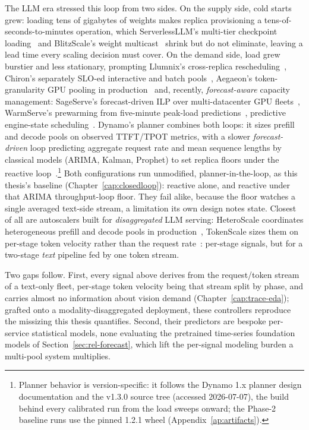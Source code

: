 The LLM era stressed this loop from two sides. On the supply side, cold
starts grew: loading tens of gigabytes of weights makes replica
provisioning a tens-of-seconds-to-minutes operation, which
ServerlessLLM's multi-tier checkpoint loading~\cite{Fu2024ServerlessLLM}
and BlitzScale's weight multicast~\cite{Zhang2025BlitzScale} shrink but
do not eliminate, leaving a lead time every scaling decision must cover.
On the demand side, load grew burstier and less stationary, prompting
Llumnix's cross-replica rescheduling~\cite{Llumnix2024}, Chiron's
separately SLO-ed interactive and batch
pools~\cite{Patke2025Chiron}, Aegaeon's token-granularity GPU
pooling in production~\cite{Xiang2025Aegaeon} and, recently,
\emph{forecast-aware} capacity management: SageServe's forecast-driven
ILP over multi-datacenter GPU fleets~\cite{Jaiswal2025SageServe},
WarmServe's prewarming from five-minute peak-load
predictions~\cite{WarmServe2025}, predictive engine-state
scheduling~\cite{Zhang2025SynergySched}. Dynamo's planner
combines both loops: it sizes prefill and decode pools on
observed TTFT/TPOT metrics, with a slower \emph{forecast-driven} loop
predicting aggregate request rate and mean sequence lengths by classical
models (ARIMA, Kalman, Prophet) to set replica floors under the reactive
loop~\cite{Dynamo2025}.\footnote{Planner behavior is version-specific:
it follows the Dynamo 1.x planner design documentation and the v1.3.0
source tree (accessed 2026-07-07), the build behind every calibrated
run from the load sweeps onward; the Phase-2 baseline runs use the
pinned 1.2.1 wheel (Appendix~\ref{ap:artifacts}).} Both configurations
run unmodified, planner-in-the-loop, as this thesis's baseline
(Chapter~\ref{cap:closedloop}): reactive alone, and reactive under that
ARIMA throughput-loop floor. They fail alike, because the floor watches
a single averaged text-side stream, a limitation its own design notes
state.
Closest of all are autoscalers built for \emph{disaggregated} LLM
serving: HeteroScale coordinates heterogeneous prefill and decode pools
in production~\cite{Li2025TamingChaos}, TokenScale sizes them on
per-stage token velocity rather than the request
rate~\cite{Lai2025TokenScale}: per-stage signals, but for a two-stage
\emph{text} pipeline fed by one token stream.

Two gaps follow. First, every signal above derives from the
request/token stream of a text-only fleet, per-stage token velocity
being that stream split by phase, and carries almost no information
about vision demand (Chapter~\ref{cap:trace-eda}); grafted onto a
modality-disaggregated deployment, these controllers reproduce the
missizing this thesis quantifies. Second, their predictors are bespoke
per-service statistical models, none evaluating the pretrained
time-series foundation models of Section~\ref{sec:rel-forecast}, which
lift the per-signal modeling burden a multi-pool system multiplies.


